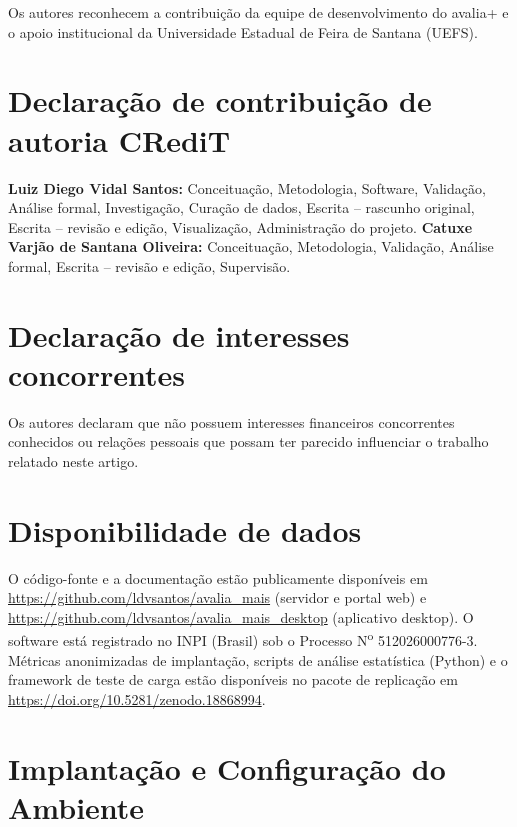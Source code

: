 \documentclass[preprint,12pt,a4paper]{elsarticle}
\begin{document}
Os autores reconhecem a contribuição da equipe de desenvolvimento do avalia+ e o apoio institucional da Universidade Estadual de Feira de Santana (UEFS).

\section*{Declaração de contribuição de autoria CRediT}

\textbf{Luiz Diego Vidal Santos:} Conceituação, Metodologia, Software, Validação, Análise formal, Investigação, Curação de dados, Escrita -- rascunho original, Escrita -- revisão e edição, Visualização, Administração do projeto. \textbf{Catuxe Varjão de Santana Oliveira:} Conceituação, Metodologia, Validação, Análise formal, Escrita -- revisão e edição, Supervisão.

\section*{Declaração de interesses concorrentes}

Os autores declaram que não possuem interesses financeiros concorrentes conhecidos ou relações pessoais que possam ter parecido influenciar o trabalho relatado neste artigo.

\section*{Disponibilidade de dados}

O código-fonte e a documentação estão publicamente disponíveis em \url{https://github.com/ldvsantos/avalia_mais} (servidor e portal web) e \url{https://github.com/ldvsantos/avalia_mais_desktop} (aplicativo desktop). O software está registrado no INPI (Brasil) sob o Processo N\textsuperscript{o} 512026000776-3. Métricas anonimizadas de implantação, scripts de análise estatística (Python) e o framework de teste de carga estão disponíveis no pacote de replicação em \url{https://doi.org/10.5281/zenodo.18868994}.

\appendix

\section{Implantação e Configuração do Ambiente}
\label{app:deployment}
\end{document}
